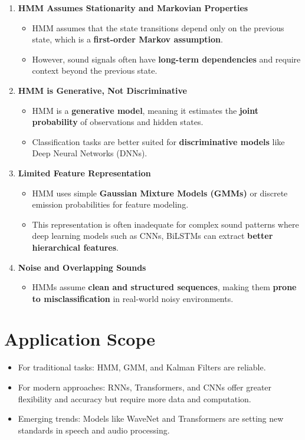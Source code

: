 \documentclass{article}
\begin{document}
    \begin{enumerate}
        \item \textbf{HMM Assumes Stationarity and Markovian Properties}
        \begin{itemize}
            \item HMM assumes that the state transitions depend only on the previous state, which is a \textbf{first-order Markov assumption}.
            \item However, sound signals often have \textbf{long-term dependencies} and require context beyond the previous state.
        \end{itemize}
    
        \item \textbf{HMM is Generative, Not Discriminative}
        \begin{itemize}
            \item HMM is a \textbf{generative model}, meaning it estimates the \textbf{joint probability} of observations and hidden states.
            \item Classification tasks are better suited for \textbf{discriminative models} like Deep Neural Networks (DNNs).
        \end{itemize}
    
        \item \textbf{Limited Feature Representation}
        \begin{itemize}
            \item HMM uses simple \textbf{Gaussian Mixture Models (GMMs)} or discrete emission probabilities for feature modeling.
            \item This representation is often inadequate for complex sound patterns where deep learning models such as CNNs, BiLSTMs can extract \textbf{better hierarchical features}.
        \end{itemize}
    
        \item \textbf{Noise and Overlapping Sounds}
        \begin{itemize}
            \item HMMs assume \textbf{clean and structured sequences}, making them \textbf{prone to misclassification} in real-world noisy environments.
        \end{itemize}
    \end{enumerate}

    \section*{Application Scope}
    \begin{itemize}
        \item For traditional tasks: HMM, GMM, and Kalman Filters are reliable.
        \item For modern approaches: RNNs, Transformers, and CNNs offer greater flexibility and accuracy but require more data and computation.
        \item Emerging trends: Models like WaveNet and Transformers are setting new standards in speech and audio processing.
    \end{itemize}
    
\end{document}
